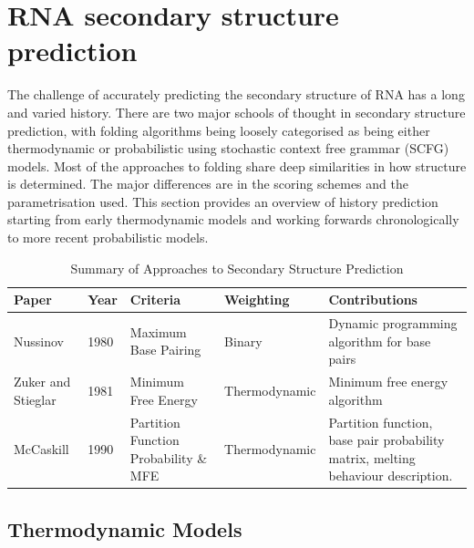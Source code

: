 \documentclass[journal]{IEEEtran}
\begin{document}
\section{RNA secondary structure prediction}
\label{sec:rna-secondary-structure}
The challenge of accurately predicting the secondary structure of RNA has a long and varied history. There are two major schools of thought in secondary structure prediction, with folding algorithms being loosely categorised as being either thermodynamic or probabilistic using stochastic context free grammar (SCFG) models. Most of the approaches to folding share deep similarities in how structure is determined. The major differences are in the scoring schemes and the parametrisation used. This section provides an overview of history prediction starting from early thermodynamic models and working forwards chronologically to more recent probabilistic models.

\begin{table}[t]
\centering
\caption{Summary of Approaches to Secondary Structure Prediction}
\label{my-label}
\begin{tabular}{|l|l|l|l|p{5cm}|}
\hline
\textbf{Paper}                             & \textbf{Year} & \textbf{Criteria}                     & \textbf{Weighting} & \textbf{Contributions}                                                           \\ \hline
Nussinov \cite{nussinov1980fast}           & 1980          & Maximum Base Pairing                  & Binary             & Dynamic programming algorithm for base pairs                                     \\ \hline
Zuker and Stieglar \cite{zuker1981optimal} & 1981          & Minimum Free Energy                   & Thermodynamic      & Minimum free energy algorithm                                                    \\ \hline
McCaskill \cite{mccaskill1990equilibrium}  & 1990          & Partition Function Probability \& MFE & Thermodynamic      & Partition function, base pair probability matrix, melting behaviour description. \\ \hline
\end{tabular}
\end{table}

\subsection{Thermodynamic Models}
\label{subsec:thermodynamic-models}
\end{document}
